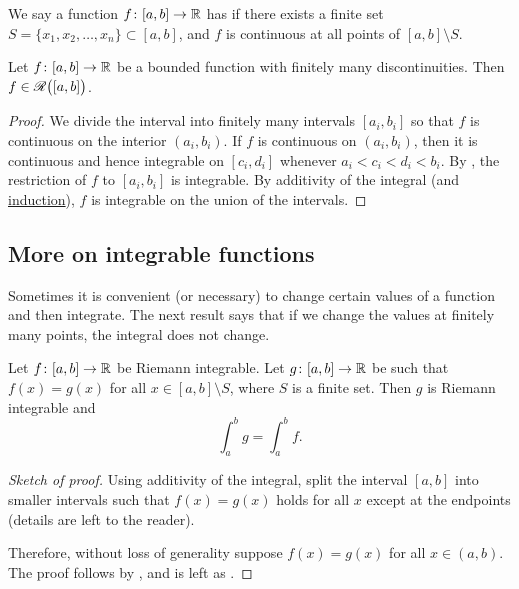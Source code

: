 We say a function $f \colon [a,b] \to {\mathbb{R}}$ has \emph{} if there exists a finite set $S = \{ x_1, x_2, \ldots, x_n \}
\subset [a,b]$, and $f$ is continuous
at all points of $[a,b] \setminus S$.

\begin{thm}
Let $f \colon [a,b] \to {\mathbb{R}}$ be a bounded function with finitely
many discontinuities.  Then $f \in {\mathscr{R}}\bigl([a,b]\bigr)$.
\end{thm}

\begin{proof}
We divide the interval into finitely many intervals $[a_i,b_i]$
so that $f$ is continuous
on the interior $(a_i,b_i)$.  If $f$ is continuous on $(a_i,b_i)$,
then it is continuous and hence integrable on $[c_i,d_i]$ whenever $a_i < c_i < d_i < b_i$.  By
,
the restriction
of $f$ to $[a_i,b_i]$ is integrable.
By additivity of the integral (and \hyperref[induction:thm]{induction}),
$f$ is integrable on the union of the intervals.
\end{proof}

\subsection{More on integrable functions}

Sometimes it is convenient (or necessary)
to change certain values of a function and
then integrate.  The next result says
that if we change the values at finitely
many points, the integral does not change.

\begin{prop}
Let $f \colon [a,b] \to {\mathbb{R}}$ be Riemann integrable.  Let $g \colon [a,b] \to
{\mathbb{R}}$ be such that $f(x) = g(x)$ for all $x \in [a,b] \setminus S$,
where $S$ is a finite set.
Then $g$ is Riemann integrable and
\begin{equation*}
\int_a^b g = \int_a^b f.
\end{equation*}
\end{prop}

\begin{proof}[Sketch of proof]
Using additivity of the integral, split the interval $[a,b]$ into
smaller intervals such that $f(x) = g(x)$ holds for all $x$ except at the
endpoints (details are left to the reader).

Therefore, without loss of generality suppose $f(x) = g(x)$ for
all $x \in (a,b)$.  The proof follows by ,
and is left as .
\end{proof}

